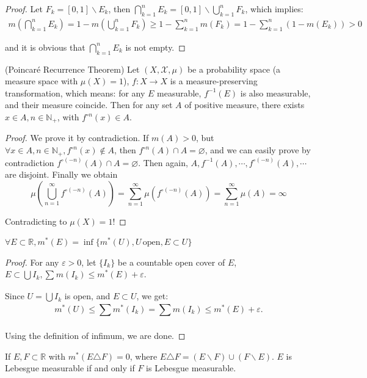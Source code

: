 \begin{proof}
	Let $ F_{k}=[0,1]\backslash E_{k} $, then $
		\bigcap_{k=1}^n{E_k}=\left[ 0,1 \right] \backslash \bigcup_{k=1}^n{F_k}
	$, which implies:
	\begin{gather*}
		m\left( \bigcap_{k=1}^n{E_k} \right) =1-m\left( \bigcup_{k=1}^n{F_k} \right)
		\ge 1-\sum_{k=1}^n{m( F_k )}
		=1-\sum_{k=1}^n{( 1-m( E_k ) )}>0
	\end{gather*}

	and it is obvious that $
		\bigcap_{k=1}^n{E_k}
	$ is not empty.
\end{proof}

\begin{problem}
	(Poincaré Recurrence Theorem)
	Let $ (X,\mathcal{X} ,\mu) $ be a probability space
	(a measure space with $ \mu(X)=1 $), $ f\colon X\to X $ is a measure-preserving transformation,
	which means: for any $ E $ measurable, $ f^{-1}(E) $ is also measurable,
	and their measure coincide. Then for any set $ A $ of positive measure,
	there exists $ x\in A,n\in \mathbb{N}_{+} $, with $ f^{\circ n}(x)\in A $.
\end{problem}

\begin{proof}
	We prove it by contradiction. If $ m(A)>0 $, but $ \forall x\in A,n\in \mathbb{N}_{+} ,
		f^{\circ n}(x)\notin A $, then $ f^{\circ n}(A)\cap A=\varnothing $,
	and we can easily prove by contradiction $ f^{\circ (-n)}(A)\cap A=\varnothing $.
	Then again, $
		A,f^{-1}( A ) ,\cdots ,f^{\circ (-n)}( A ) ,\cdots
	$ are disjoint. Finally we obtain
	$$
		\mu \left( \bigcup_{n=1}^{\infty}{f^{\circ ( -n )}( A )} \right)
		=\sum_{n=1}^{\infty}{\mu \left( f^{\circ ( -n )}( A ) \right)}
		=\sum_{n=1}^{\infty}{\mu ( A )}=\infty
	$$

	Contradicting to $ \mu(X)=1 $!
\end{proof}

\begin{problem} \label{pro:outer_by_open}
$
	\forall E \subset \mathbb{R} ,m^{*}(E)=\inf\{m^{*}(U),U\,\text{open},E\subset U\}
$
\end{problem}

\begin{proof}
	For any $ \varepsilon>0 $, let $ \{I_{k}\} $ be a countable open cover of $ E $,
	$ E\subset \bigcup I_{k},\sum_{}^{}{m( I_k ) \le m^*( E ) +\varepsilon} $.

	Since $ U=\bigcup I_{k} $ is open, and $ E\subset U $, we get:
	\[
		m^*( U ) \le \sum_{}^{}{m^*( I_k )}=\sum_{}^{}{m( I_k )}
		\le m^*( E ) +\varepsilon.
	\]

	Using the definition of infimum, we are done.

\end{proof}
\begin{problem}
If $ E,F\subset \mathbb{R}$ with $m^{*}(E\triangle F)=0 $,
where $ E\triangle F=(E\backslash F)\cup (F\backslash E) $.
$ E $ is Lebesgue measurable if and only if $ F $ is Lebesgue measurable.
\end{problem}

